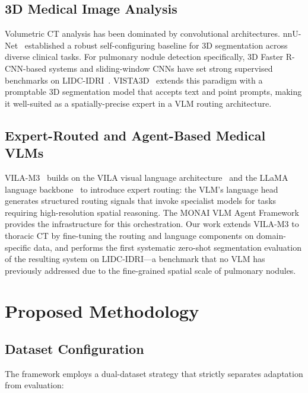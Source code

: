 \documentclass{iopconfser}
\begin{document}
\subsection{3D Medical Image Analysis}

Volumetric CT analysis has been dominated by convolutional architectures.
nnU-Net~\cite{nnunet2021} established a robust self-configuring baseline for 3D
segmentation across diverse clinical tasks. For pulmonary nodule detection
specifically, 3D Faster R-CNN-based systems and sliding-window CNNs have set
strong supervised benchmarks on LIDC-IDRI~\cite{lidc2011}. VISTA3D~\cite{vista3d2024}
extends this paradigm with a promptable 3D segmentation model that accepts text
and point prompts, making it well-suited as a spatially-precise expert in a
VLM routing architecture.

\subsection{Expert-Routed and Agent-Based Medical VLMs}

VILA-M3~\cite{vilaM32024} builds on the VILA visual language architecture~\cite{vila2024}
and the LLaMA language backbone~\cite{llama2023} to introduce expert routing:
the VLM's language head generates structured routing signals that invoke
specialist models for tasks requiring high-resolution spatial reasoning. The
MONAI VLM Agent Framework~\cite{monai2022} provides the infrastructure for
this orchestration. Our work extends VILA-M3 to thoracic CT by fine-tuning the
routing and language components on domain-specific data, and performs the first
systematic zero-shot segmentation evaluation of the resulting system on
LIDC-IDRI---a benchmark that no VLM has previously addressed due to the
fine-grained spatial scale of pulmonary nodules.


\section{Proposed Methodology}

\subsection{Dataset Configuration}

The framework employs a dual-dataset strategy that strictly separates
adaptation from evaluation:
\end{document}
